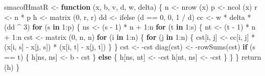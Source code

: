 \documentclass[
  12pt,
  letterpaper,
  DIV=11,
  numbers=noendperiod]{scrreprt}
\newenvironment{Shaded}{\begin{snugshade}}{\end{snugshade}}
\newcommand{\ControlFlowTok}[1]{\textcolor[rgb]{0.00,0.23,0.31}{\textbf{#1}}}
\newcommand{\DecValTok}[1]{\textcolor[rgb]{0.68,0.00,0.00}{#1}}
\newcommand{\FunctionTok}[1]{\textcolor[rgb]{0.28,0.35,0.67}{#1}}
\newcommand{\NormalTok}[1]{\textcolor[rgb]{0.00,0.23,0.31}{#1}}
\newcommand{\OtherTok}[1]{\textcolor[rgb]{0.00,0.23,0.31}{#1}}
\newcommand{\SpecialCharTok}[1]{\textcolor[rgb]{0.37,0.37,0.37}{#1}}
\theoremstyle{remark}
\begin{document}
\begin{Shaded}
\begin{Highlighting}[]
\NormalTok{smacofHmatR }\OtherTok{\textless{}{-}} \ControlFlowTok{function}\NormalTok{ (x, b, v, d, w, delta) \{}
\NormalTok{  n }\OtherTok{\textless{}{-}} \FunctionTok{nrow}\NormalTok{ (x)}
\NormalTok{  p }\OtherTok{\textless{}{-}} \FunctionTok{ncol}\NormalTok{ (x)}
\NormalTok{  r }\OtherTok{\textless{}{-}}\NormalTok{ n }\SpecialCharTok{*}\NormalTok{ p}
\NormalTok{  h }\OtherTok{\textless{}{-}} \FunctionTok{matrix}\NormalTok{ (}\DecValTok{0}\NormalTok{, r, r)}
\NormalTok{  dd }\OtherTok{\textless{}{-}} \FunctionTok{ifelse}\NormalTok{ (d }\SpecialCharTok{==} \DecValTok{0}\NormalTok{, }\DecValTok{0}\NormalTok{, }\DecValTok{1} \SpecialCharTok{/}\NormalTok{ d)}
\NormalTok{  cc }\OtherTok{\textless{}{-}}\NormalTok{ w }\SpecialCharTok{*}\NormalTok{ delta }\SpecialCharTok{*}\NormalTok{ (dd }\SpecialCharTok{\^{}} \DecValTok{3}\NormalTok{)}
  \ControlFlowTok{for}\NormalTok{ (s }\ControlFlowTok{in} \DecValTok{1}\SpecialCharTok{:}\NormalTok{p) \{}
\NormalTok{    ns }\OtherTok{\textless{}{-}}\NormalTok{ (s }\SpecialCharTok{{-}} \DecValTok{1}\NormalTok{) }\SpecialCharTok{*}\NormalTok{ n }\SpecialCharTok{+} \DecValTok{1}\SpecialCharTok{:}\NormalTok{n}
    \ControlFlowTok{for}\NormalTok{ (t }\ControlFlowTok{in} \DecValTok{1}\SpecialCharTok{:}\NormalTok{s) \{}
\NormalTok{      nt }\OtherTok{\textless{}{-}}\NormalTok{ (t }\SpecialCharTok{{-}} \DecValTok{1}\NormalTok{) }\SpecialCharTok{*}\NormalTok{ n }\SpecialCharTok{+} \DecValTok{1}\SpecialCharTok{:}\NormalTok{n}
\NormalTok{      cst }\OtherTok{\textless{}{-}} \FunctionTok{matrix}\NormalTok{ (}\DecValTok{0}\NormalTok{, n, n)}
      \ControlFlowTok{for}\NormalTok{ (i }\ControlFlowTok{in} \DecValTok{1}\SpecialCharTok{:}\NormalTok{n) \{}
        \ControlFlowTok{for}\NormalTok{ (j }\ControlFlowTok{in} \DecValTok{1}\SpecialCharTok{:}\NormalTok{n) \{}
\NormalTok{          cst[i, j] }\OtherTok{\textless{}{-}}\NormalTok{ cc[i, j] }\SpecialCharTok{*}\NormalTok{ (x[i, s] }\SpecialCharTok{{-}}\NormalTok{ x[j, s]) }\SpecialCharTok{*}\NormalTok{ (x[i, t] }\SpecialCharTok{{-}}\NormalTok{ x[j, t])}
\NormalTok{        \}}
\NormalTok{      \}}
\NormalTok{      cst }\OtherTok{\textless{}{-}} \SpecialCharTok{{-}}\NormalTok{cst}
      \FunctionTok{diag}\NormalTok{(cst) }\OtherTok{\textless{}{-}} \SpecialCharTok{{-}}\FunctionTok{rowSums}\NormalTok{(cst)}
      \ControlFlowTok{if}\NormalTok{ (s }\SpecialCharTok{==}\NormalTok{ t) \{}
\NormalTok{        h[ns, ns] }\OtherTok{\textless{}{-}}\NormalTok{ b }\SpecialCharTok{{-}}\NormalTok{ cst}
\NormalTok{      \} }\ControlFlowTok{else}\NormalTok{ \{}
\NormalTok{        h[ns, nt] }\OtherTok{\textless{}{-}} \SpecialCharTok{{-}}\NormalTok{cst}
\NormalTok{        h[nt, ns] }\OtherTok{\textless{}{-}} \SpecialCharTok{{-}}\NormalTok{cst}
\NormalTok{      \}}
\NormalTok{    \}}
\NormalTok{  \}}
  \FunctionTok{return}\NormalTok{ (h)}
\NormalTok{\}}


\end{Highlighting}
\end{Shaded}
\end{document}
